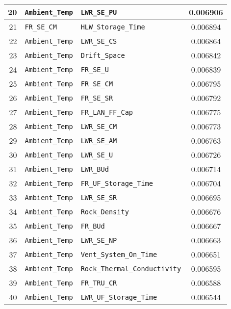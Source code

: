 \begin{center}
\begin{table}[htbp]
\begin{center}
\begin{tabular}{|r|l|l|c|}
\hline
20&\texttt{Ambient\_Temp}&\texttt{LWR\_SE\_PU}&0.006906\\
\hline
21&\texttt{FR\_SE\_CM}&\texttt{HLW\_Storage\_Time}&0.006894\\
\hline
22&\texttt{Ambient\_Temp}&\texttt{LWR\_SE\_CS}&0.006864\\
\hline
23&\texttt{Ambient\_Temp}&\texttt{Drift\_Space}&0.006842\\
\hline
24&\texttt{Ambient\_Temp}&\texttt{FR\_SE\_U}&0.006839\\
\hline
25&\texttt{Ambient\_Temp}&\texttt{FR\_SE\_CM}&0.006795\\
\hline
26&\texttt{Ambient\_Temp}&\texttt{FR\_SE\_SR}&0.006792\\
\hline
27&\texttt{Ambient\_Temp}&\texttt{FR\_LAN\_FF\_Cap}&0.006775\\
\hline
28&\texttt{Ambient\_Temp}&\texttt{LWR\_SE\_CM}&0.006773\\
\hline
29&\texttt{Ambient\_Temp}&\texttt{LWR\_SE\_AM}&0.006763\\
\hline
30&\texttt{Ambient\_Temp}&\texttt{LWR\_SE\_U}&0.006726\\
\hline
31&\texttt{Ambient\_Temp}&\texttt{LWR\_BUd}&0.006714\\
\hline
32&\texttt{Ambient\_Temp}&\texttt{FR\_UF\_Storage\_Time}&0.006704\\
\hline
33&\texttt{Ambient\_Temp}&\texttt{LWR\_SE\_SR}&0.006695\\
\hline
34&\texttt{Ambient\_Temp}&\texttt{Rock\_Density}&0.006676\\
\hline
35&\texttt{Ambient\_Temp}&\texttt{FR\_BUd}&0.006667\\
\hline
36&\texttt{Ambient\_Temp}&\texttt{LWR\_SE\_NP}&0.006663\\
\hline
37&\texttt{Ambient\_Temp}&\texttt{Vent\_System\_On\_Time}&0.006651\\
\hline
38&\texttt{Ambient\_Temp}&\texttt{Rock\_Thermal\_Conductivity}&0.006595\\
\hline
39&\texttt{Ambient\_Temp}&\texttt{FR\_TRU\_CR}&0.006588\\
\hline
40&\texttt{Ambient\_Temp}&\texttt{LWR\_UF\_Storage\_Time}&0.006544\\
\hline
\end{tabular}
\end{center}
\end{table}
\end{center}

